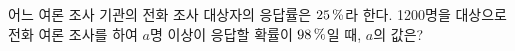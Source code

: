 어느 여론 조사 기관의 전화 조사 대상자의 응답률은 $25\mkern3mu \%$라 한다. 1200명을 대상으로 전화 여론 조사를 하여 $a$명 이상이 응답할 확률이 $98\mkern3mu \%$일 때, $a$의 값은? 

